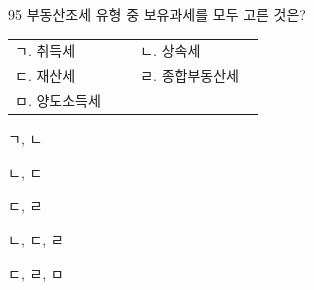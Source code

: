 \begin{question}{95}
부동산조세 유형 중 보유과세를 모두 고른 것은?
\begin{framedtext}
\begin{tabular}{@{}p{0.45\linewidth}@{}p{0.45\linewidth}@{}}
ㄱ. 취득세 & ㄴ. 상속세 \\
ㄷ. 재산세 & ㄹ. 종합부동산세 \\
ㅁ. 양도소득세 & \\
\end{tabular}
\end{framedtext}
\begin{choices}
  \item ㄱ, ㄴ
  \item ㄴ, ㄷ
  \item ㄷ, ㄹ
  \item ㄴ, ㄷ, ㄹ
  \item ㄷ, ㄹ, ㅁ
\end{choices}
\end{question}

